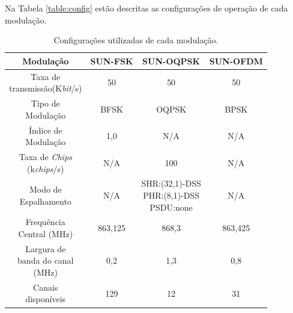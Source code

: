 Na Tabela \ref{table:config} estão descritas as configurações de operação de cada modulação.
\begin{table}[H]
      \centering
      \caption{Configurações utilizadas de cada modulação.}
      \begin{tabular}{|c c c c|}
            \hline
            Modulação & SUN-FSK        & SUN-OQPSK         & SUN-OFDM \\ [0.5ex]
            \hline\hline
            \makecell{Taxa de                                         \\transmissão(K\emph{bit}/s)    } & 50      & 50                       & 50       \\\hline
            \makecell{Tipo de                                         \\Modulação                     } & BFSK    & OQPSK                    & BPSK     \\\hline
            \makecell{Índice de                                       \\Modulação                   } & 1,0     & N/A                      & N/A      \\\hline
            \makecell{Taxa de \emph{Chips}                            \\(k\emph{chips}/s) } &   N/A      & 100                      & N/A      \\\hline
            \makecell{Modo de                                         \\Espalhamento                  } & N/A     & \makecell{SHR:(32,1)-DSS            \\ PHR:(8,1)-DSS\\ PSDU:none} & N/A      \\\hline
            \makecell{Frequência                                      \\Central (MHz)              } & 863,125   & 868,3                      & 863,425    \\\hline
            \makecell{Largura de                                      \\banda do canal                                                               \\(MHz)        } & 0,2     & 1,3                     & 0,8      \\\hline
            \makecell{Canais                                          \\disponíveis                    } & 129     & 12                       & 31       \\\hline

\end{tabular}
\end{table}
